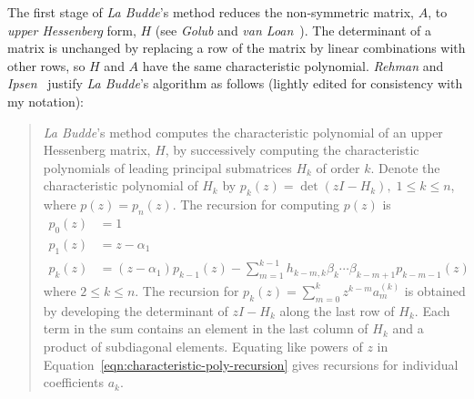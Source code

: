 \documentclass[a4paper,twoside,10pt,english]{report}
\begin{document}
The first stage of \emph{La Budde}'s method reduces the non-symmetric 
matrix, $A$, to \emph{upper Hessenberg} form, $H$ (see \emph{Golub} and 
\emph{van Loan}~\cite[Section 7.4]{GolubVanLoan_MatrixComputations}).
The determinant of a matrix is unchanged by replacing a row of the matrix by
linear combinations with other rows, so $H$ and $A$ have the same characteristic
polynomial. \emph{Rehman} and 
\emph{Ipsen}~\cite[pp.10-11]{RehmanIpsen_BuddeCharacteristicPoly} justify 
\emph{La Budde}'s algorithm as follows (lightly edited for consistency with my
notation):
\begin{quotation}
\emph{La Budde}'s method computes the characteristic polynomial of 
an upper Hessenberg matrix, $H$, by successively computing the characteristic 
polynomials of leading principal submatrices $H_{k}$ of order $k$. Denote the
characteristic polynomial of $H_{k}$ by 
$p_{k}\left(z\right)=\det\left(zI-H_{k}\right),\;1\le{}k\le{n}$, 
where $p\left(z\right)=p_{n}\left(z\right)$. The recursion for computing 
$p\left(z\right)$ is \cite[Section 6.57.1]{Wilkinson_AlgebraicEigenvalueProblem}
\begin{align}
p_{0}\left(z\right)&=1\nonumber\\
p_{1}\left(z\right)&=z-\alpha_{1}\nonumber\\
p_{k}\left(z\right)&=(z-\alpha_{1})p_{k-1}\left(z\right)
-\sum_{m=1}^{k-1}h_{k-m,k}\beta_{k}\cdots\beta_{k-m+1}p_{k-m-1}\left(z\right)
\label{eqn:characteristic-poly-recursion}
\end{align}
where $2\le{}k\le{}n$. The recursion for 
$p_{k}\left(z\right)=\sum_{m=0}^{k}z^{k-m}a_{m}^{\left(k\right)}$ is obtained by 
developing the determinant of $zI-H_{k}$ along the last row of $H_{k}$. Each
term in the sum contains an element in the last column of $H_{k}$ and a product
of subdiagonal elements. Equating like powers of $z$ in 
Equation~\ref{eqn:characteristic-poly-recursion} gives recursions for 
individual coefficients $a_{k}$.
\end{quotation}
\end{document}
